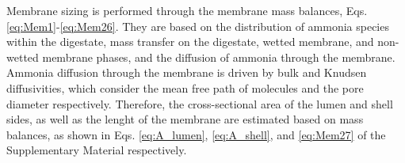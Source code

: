 \begin{refsection}[referencesCh6]

Membrane sizing is performed through the membrane mass balances,
Eqs. \ref{eq:Mem1}-\ref{eq:Mem26}.
They are based on the distribution of ammonia species within the digestate, mass transfer on the digestate, wetted membrane, and non-wetted membrane phases, and the diffusion of ammonia through the membrane. Ammonia diffusion through the membrane is driven by bulk and Knudsen diffusivities, which consider the mean free path of molecules and the pore diameter respectively. Therefore, the cross-sectional area of the lumen and shell sides, as well as the lenght of the membrane are estimated based on mass balances, as shown in
Eqs. \ref{eq:A_lumen}, \ref{eq:A_shell}, and \ref{eq:Mem27} of the Supplementary Material respectively.


\end{refsection}
